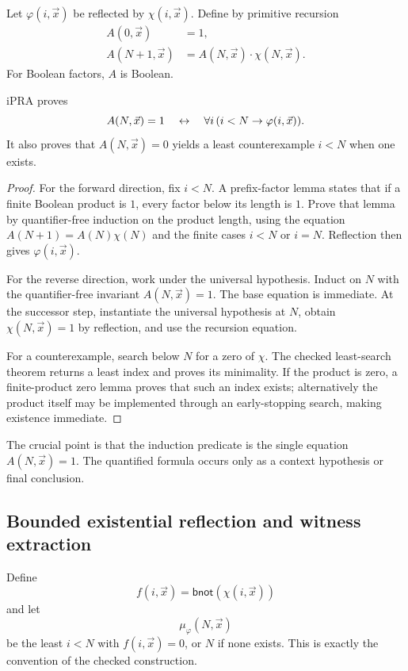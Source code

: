 Let \(\varphi(i,\vec x)\) be reflected by
\(\chi(i,\vec x)\).  Define by primitive recursion
\[
\begin{aligned}
  A(0,\vec x)&=1,\\
  A(N+1,\vec x)&=A(N,\vec x)\cdot \chi(N,\vec x).
\end{aligned}
\]
For Boolean factors, \(A\) is Boolean.

\begin{theorem}
iPRA proves
\[
 A(N,\vec x)=1
 \quad\leftrightarrow\quad
 \forall i\,(i<N\to\varphi(i,\vec x)).
\]
It also proves that \(A(N,\vec x)=0\) yields a least counterexample
\(i<N\) when one exists.
\end{theorem}

\begin{proof}
For the forward direction, fix \(i<N\).  A prefix-factor lemma states that if
a finite Boolean product is \(1\), every factor below its length is \(1\).
Prove that lemma by quantifier-free induction on the product length, using the
equation \(A(N+1)=A(N)\chi(N)\) and the finite cases \(i<N\) or \(i=N\).
Reflection then gives \(\varphi(i,\vec x)\).

For the reverse direction, work under the universal hypothesis.  Induct on
\(N\) with the quantifier-free invariant \(A(N,\vec x)=1\).  The base equation
is immediate.  At the successor step, instantiate the universal hypothesis at
\(N\), obtain \(\chi(N,\vec x)=1\) by reflection, and use the recursion
equation.

For a counterexample, search below \(N\) for a zero of \(\chi\).  The checked
least-search theorem returns a least index and proves its minimality.  If the
product is zero, a finite-product zero lemma proves that such an index exists;
alternatively the product itself may be implemented through an early-stopping
search, making existence immediate.
\end{proof}

The crucial point is that the induction predicate is the single equation
\(A(N,\vec x)=1\).  The quantified formula occurs only as a context hypothesis
or final conclusion.

\subsection{Bounded existential reflection and witness extraction}

Define
\[
   f(i,\vec x)=\mathsf{bnot}(\chi(i,\vec x))
\]
and let
\[
   \mu_\varphi(N,\vec x)
\]
be the least \(i<N\) with \(f(i,\vec x)=0\), or \(N\) if none exists.  This is
exactly the convention of the checked  construction.

